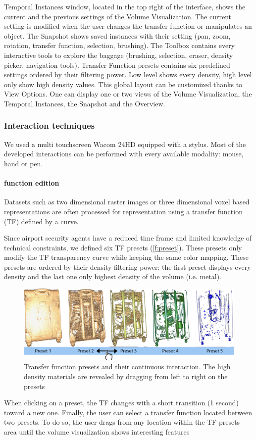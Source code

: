 Temporal Instances window, located in the top right of the interface, shows the current and the previous settings of the Volume Visualization. The current setting is modified when the user changes the transfer function or manipulates an object.
The Snapshot shows saved instances with their setting (pan, zoom, rotation, transfer function, selection, brushing).
The Toolbox contains every interactive tools to explore the baggage (brushing, selection, eraser, density picker, navigation tools).
Transfer Function presets contains six predefined settings ordered by their filtering power. Low level shows every density, high level only show high density values. 
This global layout can be customized thanks to View Options. One can display one or two views of the Volume Visualization, the Temporal Instances, the Snapshot and the Overview.

\subsubsection{Interaction techniques}

We used a multi touchscreen Wacom 24HD equipped with a stylus. Most of the developed interactions can be performed with every available modality: mouse, hand or pen.
\paragraph{ function edition}	
Datasets such as two dimensional raster images or three dimensional voxel based representations are often processed for representation using a transfer function (TF) defined by a curve. 

Since airport security agents have a reduced time frame and limited knowledge of technical constraints, we defined six TF presets (\autoref{f:preset}). These presets only modify the TF transparency curve while keeping the same color mapping. These presets are ordered by their density filtering power: the first preset displays every density and the last one only highest density of the volume (i.e. metal). 

\begin{figure}
   \centering   
	\includegraphics[width=15cm]{Figures/preset.png}
	\caption{ Transfer function presets and their continuous interaction. The high density materials are revealed by dragging from left to right on the presets }
	\label{f:preset}
\end{figure}
When clicking on a preset, the TF changes with a short transition (1 second) toward a new one. 
Finally, the user can select a transfer function located between two presets. To do so, the user drags from any location within the TF presets area until the volume visualization shows interesting features 

